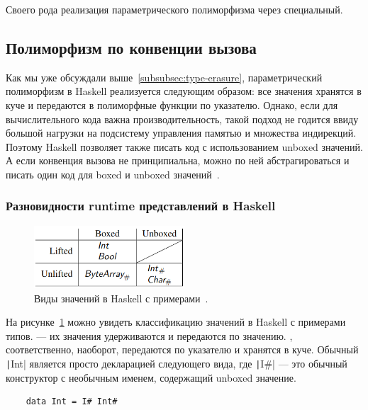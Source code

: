 Своего рода реализация параметрического полиморфизма через специальный.

\subsection{Полиморфизм по конвенции вызова} \label{subsec:representation-polymorphism}

Как мы уже обсуждали выше~\ref{subsubsec:type-erasure}, параметрический полиморфизм в Haskell реализуется следующим образом: все значения хранятся в куче и передаются в полиморфные функции по указателю.
Однако, если для вычислительного кода важна производительность, такой подход не годится ввиду большой нагрузки на подсистему управления памятью и множества индирекций.
Поэтому Haskell позволяет также писать код с использованием unboxed значений.
А если конвенция вызова не принципиальна, можно по ней абстрагироваться и писать один код для boxed и unboxed значений~\cite{eisenberg2017levity}.

\subsubsection{Разновидности runtime представлений в Haskell}

\begin{figure}[h]
    \centering
    \includegraphics[width=0.5\textwidth]{figs/haskell-value-kinds}
    \caption{Виды значений в Haskell с примерами~\cite{eisenberg2017levity}.}
    \label{fig:haskell-value-kinds}
\end{figure}

На рисунке~\ref{fig:haskell-value-kinds} можно увидеть классификацию значений в Haskell с примерами типов.
 --- их значения удерживаются и передаются по значению.
, соответственно, наоборот, передаются по указателю и хранятся в куче.
Обычный \texttt|Int| является просто декларацией следующего вида, где \texttt|I#| --- это обычный конструктор с необычным именем, содержащий unboxed значение.
\begin{verbatim}
    data Int = I# Int#
\end{verbatim}

